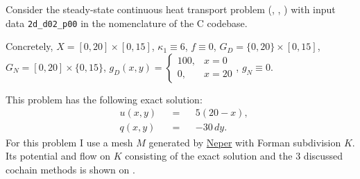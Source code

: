 \begin{example}
  Consider the steady-state continuous heat transport problem 
  (,
   ,
   )
  with input data \verb|2d_d02_p00| in the nomenclature of the C codebase.

  Concretely, $X = [0, 20] \times [0, 15]$, $\kappa_1 \equiv 6$, $f \equiv 0$,
  $G_D = \{0, 20\} \times [0, 15]$, $G_N = [0, 20] \times \{0, 15\}$,
  $g_D(x, y) = \begin{cases} 100, & x = 0 \\ 0, & x = 20 \end{cases}$,
  $g_N \equiv 0$.

  This problem has the following exact solution:
  \begin{subequations}
    \begin{alignat}{3}
      & u(x, y) && = && 5 (20 - x), \\
      & q(x, y) && = && -30\, d y.
    \end{alignat}
  \end{subequations}
  For this problem I use a mesh $M$ generated by
  \href{https://neper.info/}{Neper} with Forman subdivision $K$.
  Its potential and flow on $K$ consisting of the exact solution and the $3$
  discussed cochain methods is shown on
  .
\end{example}
